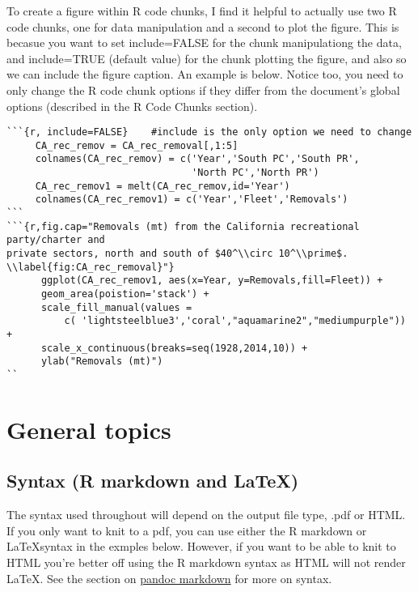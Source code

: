 \documentclass[12pt,]{article}
\begin{document}
To create a figure within R code chunks, I find it helpful to actually
use two R code chunks, one for data manipulation and a second to plot
the figure. This is becasue you want to set include=FALSE for the chunk
manipulationg the data, and include=TRUE (default value) for the chunk
plotting the figure, and also so we can include the figure caption. An
example is below. Notice too, you need to only change the R code chunk
options if they differ from the document's global options (described in
the R Code Chunks section).

\begin{Verbatim}[frame=single]
```{r, include=FALSE}    #include is the only option we need to change
     CA_rec_remov = CA_rec_removal[,1:5]
     colnames(CA_rec_remov) = c('Year','South PC','South PR',
                                'North PC','North PR')
     CA_rec_remov1 = melt(CA_rec_remov,id='Year')
     colnames(CA_rec_remov1) = c('Year','Fleet','Removals')
```
```{r,fig.cap="Removals (mt) from the California recreational party/charter and 
private sectors, north and south of $40^\\circ 10^\\prime$. 
\\label{fig:CA_rec_removal}"}
      ggplot(CA_rec_remov1, aes(x=Year, y=Removals,fill=Fleet)) +
      geom_area(poistion='stack') + 
      scale_fill_manual(values = 
          c( 'lightsteelblue3','coral',"aquamarine2","mediumpurple")) + 
      scale_x_continuous(breaks=seq(1928,2014,10)) + 
      ylab("Removals (mt)")
``
\end{Verbatim}

\section{General topics}\label{general-topics}

\subsection{\texorpdfstring{Syntax (R markdown and
\LaTeX)}{Syntax (R markdown and )}}\label{syntax-r-markdown-and}

The syntax used throughout will depend on the output file type, .pdf or
HTML. If you only want to knit to a pdf, you can use either the R
markdown or \LaTeX syntax in the exmples below. However, if you want to
be able to knit to HTML you're better off using the R markdown syntax as
HTML will not render \LaTeX. See the section on
\href{http://rmarkdown.rstudio.com/authoring_pandoc_markdown.html}{pandoc
markdown} for more on syntax.
\end{document}
